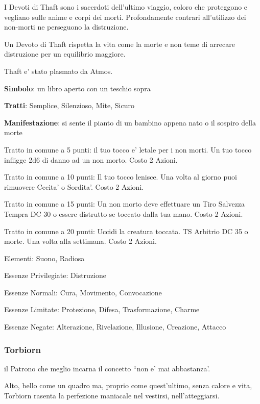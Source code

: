\documentclass[a4paper,11pt,twoside,openany]{dndbook}
\begin{document}
{I Devoti di Thaft sono i sacerdoti dell'ultimo viaggio, coloro che proteggono e vegliano sulle anime e corpi dei morti. Profondamente contrari all'utilizzo dei non-morti ne perseguono la distruzione.

Un Devoto di Thaft rispetta la vita come la morte e non teme di arrecare distruzione per un equilibrio maggiore.

Thaft e' stato plasmato da Atmos.

\textbf{Simbolo}: un libro aperto con un teschio sopra

\textbf{Tratti}: Semplice, Silenzioso, Mite, Sicuro

\textbf{Manifestazione}: si sente il pianto di un bambino appena nato o il sospiro della morte

\bigskip

Tratto in comune a 5 punti: il tuo tocco e' letale per i non morti. Un tuo tocco infligge 2d6 di danno ad un non morto. Costo 2 Azioni.

Tratto in comune a 10 punti: Il tuo tocco lenisce. Una volta al giorno puoi rimuovere Cecita' o Sordita'. Costo 2 Azioni.

Tratto in comune a 15 punti: Un non morto deve effettuare un Tiro Salvezza Tempra DC 30 o essere distrutto se toccato dalla tua mano. Costo 2 Azioni.

Tratto in comune a 20 punti: Uccidi la creatura toccata. TS Arbitrio DC 35 o morte. Una volta alla settimana. Costo 2 Azioni.

\bigskip

Elementi: Suono, Radiosa

\bigskip

Essenze Privilegiate: Distruzione

Essenze Normali: Cura, Movimento, Convocazione

Essenze Limitate: Protezione, Difesa, Trasformazione, Charme

Essenze Negate: Alterazione, Rivelazione, Illusione, Creazione, Attacco

\subsubsection{Torbiorn}

\label{torbiorn}

il Patrono che meglio incarna il concetto ``non e' mai abbastanza'.

Alto, bello come un quadro ma, proprio come quest'ultimo, senza calore e vita, Torbiorn rasenta la perfezione maniacale nel vestirsi, nell'atteggiarsi.

}
\end{document}
